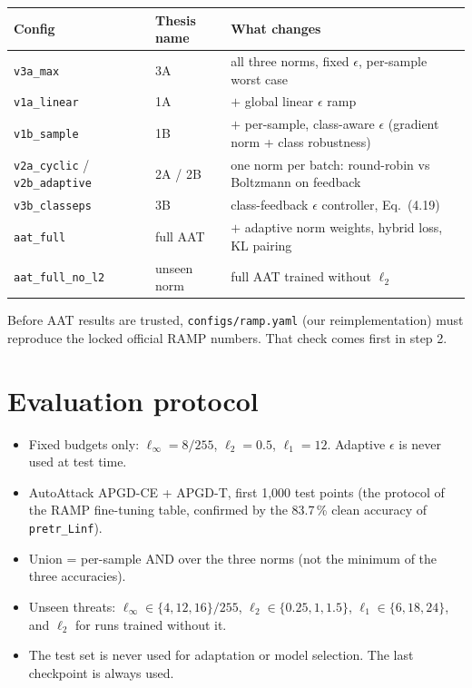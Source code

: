 \documentclass[11pt,a4paper]{article}
\newcommand{\code}[1]{\texttt{\small #1}}
\begin{document}
\begin{table}[h]
\centering\small
\begin{tabularx}{\linewidth}{@{}llX@{}}
\toprule
Config & Thesis name & What changes \\
\midrule
\code{v3a\_max} & 3A & all three norms, fixed $\epsilon$, per-sample worst case \\
\code{v1a\_linear} & 1A & $+$ global linear $\epsilon$ ramp \\
\code{v1b\_sample} & 1B & $+$ per-sample, class-aware $\epsilon$ (gradient norm + class robustness) \\
\code{v2a\_cyclic} / \code{v2b\_adaptive} & 2A / 2B & one norm per batch: round-robin vs Boltzmann on feedback \\
\code{v3b\_classeps} & 3B & class-feedback $\epsilon$ controller, Eq.~(4.19) \\
\code{aat\_full} & full AAT & $+$ adaptive norm weights, hybrid loss, KL pairing \\
\code{aat\_full\_no\_l2} & unseen norm & full AAT trained without $\ell_2$ \\
\bottomrule
\end{tabularx}
\end{table}
Before AAT results are trusted, \code{configs/ramp.yaml} (our reimplementation) must reproduce the
locked official RAMP numbers. That check comes first in step 2.

\section{Evaluation protocol}
\begin{itemize}
  \item Fixed budgets only: $\ell_\infty = 8/255$, $\ell_2 = 0.5$, $\ell_1 = 12$. Adaptive $\epsilon$ is never used at test time.
  \item AutoAttack APGD-CE + APGD-T, first 1{,}000 test points (the protocol of the RAMP fine-tuning
        table, confirmed by the 83.7\,\% clean accuracy of \code{pretr\_Linf}).
  \item Union = per-sample AND over the three norms (not the minimum of the three accuracies).
  \item Unseen threats: $\ell_\infty\in\{4,12,16\}/255$, $\ell_2\in\{0.25,1,1.5\}$, $\ell_1\in\{6,18,24\}$, and $\ell_2$ for runs trained without it.
  \item The test set is never used for adaptation or model selection. The last checkpoint is always used.
\end{itemize}
\end{document}

